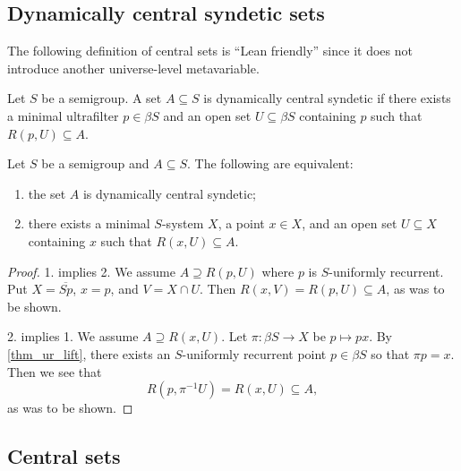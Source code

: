 \subsection{Dynamically central syndetic sets}

The following definition of central sets is ``Lean friendly'' since it does not introduce another universe-level metavariable.

\begin{definition}
    Let $S$ be a semigroup.  A set $A \subseteq S$ is dynamically central syndetic if there exists a minimal ultrafilter $p \in \beta S$ and an open set $U \subseteq \beta S$ containing $p$ such that $R(p,U) \subseteq A$.
\end{definition}


\begin{theorem}
    Let $S$ be a semigroup and $A \subseteq S$.  The following are equivalent:
    \begin{enumerate}
        \item the set $A$ is dynamically central syndetic;

        \item there exists a minimal $S$-system $X$, a point $x \in X$, and an open set $U \subseteq X$ containing $x$ such that $R(x,U) \subseteq A$.
    \end{enumerate}
\end{theorem}

\begin{proof}
    1. implies 2. We assume $A \supseteq R(p,U)$ where $p$ is $S$-uniformly recurrent.  Put $X = \overline{Sp}$, $x = p$, and $V = X \cap U$.  Then $R(x,V) = R(p,U) \subseteq A$, as was to be shown.

    2. implies 1.  We assume $A \supseteq R(x,U)$.  Let $\pi: \beta S \to X$ be $p \mapsto px$.  By \cref{thm_ur_lift}, there exists an $S$-uniformly recurrent point $p \in \beta S$ so that $\pi p = x$.  Then we see that
    \[R(p,\pi^{-1}U) = R(x,U) \subseteq A,\]
    as was to be shown.
\end{proof}

\subsection{Central sets}

